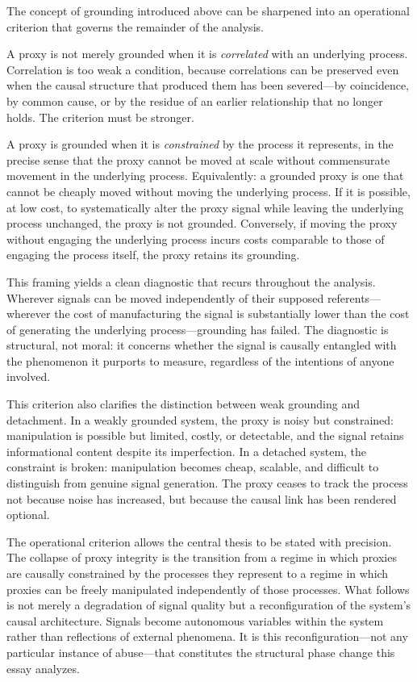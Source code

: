 \documentclass[12pt, a4paper]{article}
\begin{document}
The concept of grounding introduced above can be sharpened into an operational criterion that governs the remainder of the analysis.

A proxy is not merely grounded when it is \textit{correlated} with an underlying process. Correlation is too weak a condition, because correlations can be preserved even when the causal structure that produced them has been severed---by coincidence, by common cause, or by the residue of an earlier relationship that no longer holds. The criterion must be stronger.

A proxy is grounded when it is \textit{constrained} by the process it represents, in the precise sense that the proxy cannot be moved at scale without commensurate movement in the underlying process. Equivalently: a grounded proxy is one that cannot be cheaply moved without moving the underlying process. If it is possible, at low cost, to systematically alter the proxy signal while leaving the underlying process unchanged, the proxy is not grounded. Conversely, if moving the proxy without engaging the underlying process incurs costs comparable to those of engaging the process itself, the proxy retains its grounding.

This framing yields a clean diagnostic that recurs throughout the analysis. Wherever signals can be moved independently of their supposed referents---wherever the cost of manufacturing the signal is substantially lower than the cost of generating the underlying process---grounding has failed. The diagnostic is structural, not moral: it concerns whether the signal is causally entangled with the phenomenon it purports to measure, regardless of the intentions of anyone involved.

This criterion also clarifies the distinction between weak grounding and detachment. In a weakly grounded system, the proxy is noisy but constrained: manipulation is possible but limited, costly, or detectable, and the signal retains informational content despite its imperfection. In a detached system, the constraint is broken: manipulation becomes cheap, scalable, and difficult to distinguish from genuine signal generation. The proxy ceases to track the process not because noise has increased, but because the causal link has been rendered optional.

The operational criterion allows the central thesis to be stated with precision. The collapse of proxy integrity is the transition from a regime in which proxies are causally constrained by the processes they represent to a regime in which proxies can be freely manipulated independently of those processes. What follows is not merely a degradation of signal quality but a reconfiguration of the system's causal architecture. Signals become autonomous variables within the system rather than reflections of external phenomena. It is this reconfiguration---not any particular instance of abuse---that constitutes the structural phase change this essay analyzes.
\end{document}
